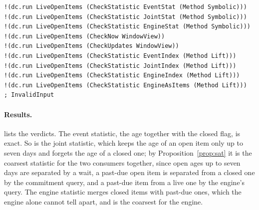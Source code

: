 \documentclass[11pt]{article}
\theoremstyle{definition}
\theoremstyle{plain}
\begin{document}
\begin{lstlisting}[style=mettamod]
!(dc.run LiveOpenItems (CheckStatistic EventStat (Method Symbolic)))
!(dc.run LiveOpenItems (CheckStatistic JointStat (Method Symbolic)))
!(dc.run LiveOpenItems (CheckStatistic EngineStat (Method Symbolic)))
!(dc.run LiveOpenItems (CheckNow WindowView))
!(dc.run LiveOpenItems (CheckUpdates WindowView))
!(dc.run LiveOpenItems (CheckStatistic EventIndex (Method Lift)))
!(dc.run LiveOpenItems (CheckStatistic JointIndex (Method Lift)))
!(dc.run LiveOpenItems (CheckStatistic EngineIndex (Method Lift)))
!(dc.run LiveOpenItems (CheckStatistic EngineAsItems (Method Lift)))   ; InvalidInput
\end{lstlisting}

\paragraph{Results.}  lists the verdicts. The event statistic, the age together with
the closed flag, is exact. So is the joint statistic, which keeps the age of an open item only up
to seven days and forgets the age of a closed one; by Proposition~\ref{prop:sat} it is the
coarsest statistic for the two consumers together, since open ages up to seven days are separated
by a wait, a past-due open item is separated from a closed one by the commitment query, and a
past-due item from a live one by the engine's query. The engine statistic merges closed items with
past-due ones, which the engine alone cannot tell apart, and is the coarsest for the engine.
\end{document}
